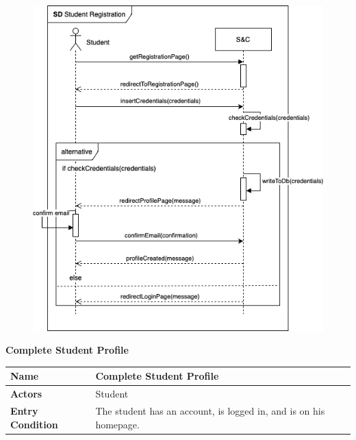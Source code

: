 \begin{enumerate}[label=\textbf{[US\arabic*]}, left = 0pt, align = left, resume]
            \newpage
            \begin{figure}[h!]
                \centering
                    \includegraphics[width=1\textwidth]{RASD/Images/UseCases/StudentRegistration.drawio.png}
                \label{fig:example}
            \end{figure}

            \newpage
            \item \textbf{Complete Student Profile}                         
            
            \begin{longtable}{|l|p{11cm}|}  
                \hline
                \textbf{Name} & 
                    \textbf{Complete Student Profile} \\
                \hline
                
                \textbf{Actors} & 
                    Student \\
                \hline
                
                \textbf{Entry Condition} & 
                    The student has an account, is logged in, and is on his homepage. \\
                \hline
                

\end{longtable}
\end{enumerate}
